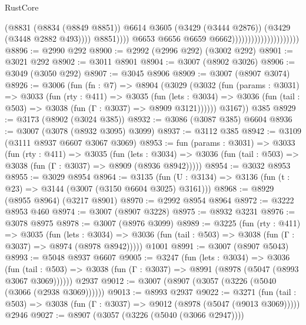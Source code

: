 \begin{lexlean}{RustCore}
\begin{coremodule}
                                                        (@8831
                                                          (@8834 (@8849 @8851))
                                                          @6614
                                                          @3605
                                                          (@3429 (@3444 @2876))
                                                          (@3429 (@3448 @2882 @493))))
                                                      @8851))))
                                              @6653
                                              @6656
                                              @6659
                                              @6662)))))))))))))))))))))
@8896 := @2990 @292
@8900 := @2992 (@2996 @292) (@3002 @292)
@8901 := @3021 @292
@8902 := @3011 @8901
@8904 := @3007 (@8902 @3026)
@8906 := @3049 (@3050 @292)
@8907 := @3045 @8906
@8909 := @3007 (@8907 @3074)
@8926 := @3006
    (fun (fn : @7) =>
    @8904
      (@3029
        (@3032
          (fun (params : @3031) =>
          @3033
            (fun (rty : @411) =>
            @3035
              (fun (lets : @3034) =>
              @3036 (fun (tail : @503) => @3038 (fun (Γ : @3037) => @8909 @3121))))))
        @3167))
    @385
@8929 := @3173 (@8902 (@3024 @385))
@8932 := @3086 (@3087 @385) @6604
@8936 := @3007 (@3078 (@8932 @3095) @3099)
@8937 := @3112 @385
@8942 := @3109 (@3111 @8937 @6607 @3067 @3069)
@8953 := fun (params : @3031) =>
  @3033
    (fun (rty : @411) =>
    @3035
      (fun (lets : @3034) =>
      @3036 (fun (tail : @503) => @3038 (fun (Γ : @3037) => @8909 (@8936 @8942)))))
@8954 := @3032 @8953
@8955 := @3029 @8954
@8964 := @3135 (fun (U : @3134) => @3136 (fun (t : @23) => @3144 (@3007 (@3150 @6604 @3025) @3161)))
@8968 := @8929 (@8955 @8964) (@3217 @8901)
@8970 := @2992 @8954 @8964
@8972 := @3222 @8953 @460
@8974 := @3007 (@8907 @3228)
@8975 := @8932 @3231
@8976 := @3078 @8975
@8978 := @3007 (@8976 @3099)
@8989 := @3225
    (fun (rty : @411) =>
    @3035
      (fun (lets : @3034) =>
      @3036 (fun (tail : @503) => @3038 (fun (Γ : @3037) => @8974 (@8978 @8942)))))
    @1001
@8991 := @3007 (@8907 @5043)
@8993 := @5048 @8937 @6607
@9005 := @3247
    (fun (lets : @3034) =>
    @3036
      (fun (tail : @503) => @3038 (fun (Γ : @3037) => @8991 (@8978 (@5047 (@8993 @3067 @3069))))))
    @2937
@9012 := @3007 (@8907 (@3057 (@3226 (@5040 (@3066 (@2938 @3069))))))
@9013 := @8993 @2937
@9022 := @3271
    (fun (tail : @503) => @3038 (fun (Γ : @3037) => @9012 (@8978 (@5047 (@9013 @3069)))))
    @2946
@9027 := @8907 (@3057 (@3226 (@5040 (@3066 @2947))))

\end{coremodule}
\end{lexlean}
